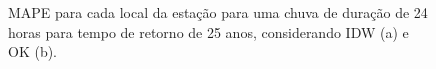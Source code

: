 \documentclass[
]{agujournal2019}
\begin{document}
\begin{figure}

\begin{minipage}{\linewidth}



\end{minipage}%
\newline
\begin{minipage}{\linewidth}



\end{minipage}%

\caption{\label{fig-Figura28}MAPE para cada local da estação para uma
chuva de duração de 24 horas para tempo de retorno de 25 anos,
considerando IDW (a) e OK (b).}

\end{figure}%
\end{document}
